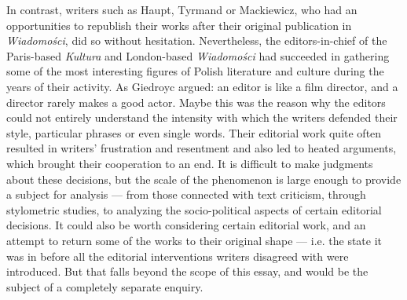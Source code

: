 \begin{paper}
In contrast, writers such as Haupt, Tyrmand or Mackiewicz, who had
an opportunities to republish their works after their original publication in \emph{Wiadomości},
did so without hesitation. Nevertheless, the editors-in-chief
of the Paris-based \emph{Kultura }and London-based \emph{Wiadomości} had succeeded in gathering some of the most
interesting figures of Polish literature and culture during the years of
their activity. As Giedroyc
argued: an editor is like a film director, and a director rarely makes
a good actor. Maybe this was the reason why the editors could not entirely
understand the intensity with which the writers defended their style,
particular phrases or even single words. Their editorial work quite
often resulted in writers' frustration and resentment and also led to
heated arguments, which brought their cooperation to an end. It is
difficult to make judgments about these decisions, but the scale of the
phenomenon is large enough to provide a subject for analysis --- from those
connected with text criticism, through stylometric studies, to analyzing the socio-political aspects of certain editorial decisions. It could also be worth considering certain editorial work, and an attempt to return some of the works to their original shape --- i.e. the state it was in before all
the editorial interventions writers disagreed with were introduced. But that falls beyond the scope of this essay, and would be the subject of a completely separate enquiry.

\vfill

\begin{flushleft}
  
\end{flushleft}
\end{paper}